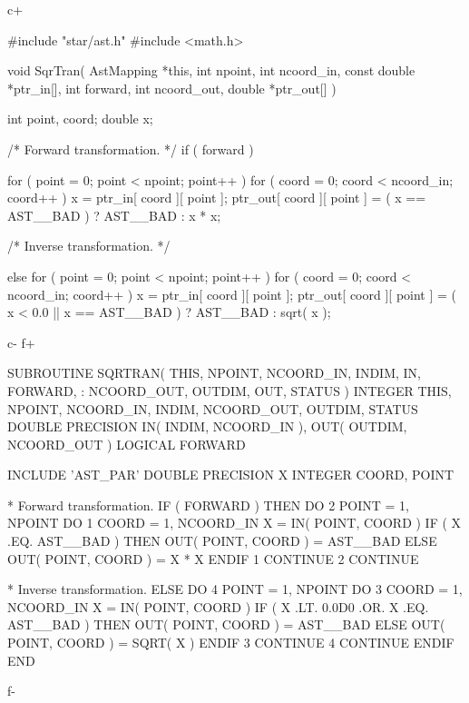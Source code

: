 \documentclass[twoside,11pt]{starlink}
\begin{document}
c+
\small
\begin{terminalv}
#include "star/ast.h"
#include <math.h>

void SqrTran( AstMapping *this, int npoint, int ncoord_in,
              const double *ptr_in[], int forward, int ncoord_out,
              double *ptr_out[] ) {
   int point, coord;
   double x;

/* Forward transformation. */
   if ( forward ) {
      for ( point = 0; point < npoint; point++ ) {
         for ( coord = 0; coord < ncoord_in; coord++ ) {
            x = ptr_in[ coord ][ point ];
            ptr_out[ coord ][ point ] = ( x == AST__BAD ) ? AST__BAD : x * x;
         }
      }

/* Inverse transformation. */
   } else {
      for ( point = 0; point < npoint; point++ ) {
         for ( coord = 0; coord < ncoord_in; coord++ ) {
            x = ptr_in[ coord ][ point ];
            ptr_out[ coord ][ point ] =
               ( x < 0.0 || x == AST__BAD ) ? AST__BAD : sqrt( x );
         }
      }
   }
}
\end{terminalv}
\normalsize
c-
f+
\small
\begin{terminalv}
      SUBROUTINE SQRTRAN( THIS, NPOINT, NCOORD_IN, INDIM, IN, FORWARD,
    :                     NCOORD_OUT, OUTDIM, OUT, STATUS )
      INTEGER THIS, NPOINT, NCOORD_IN, INDIM, NCOORD_OUT, OUTDIM, STATUS
      DOUBLE PRECISION IN( INDIM, NCOORD_IN ), OUT( OUTDIM, NCOORD_OUT )
      LOGICAL FORWARD

      INCLUDE 'AST_PAR'
      DOUBLE PRECISION X
      INTEGER COORD, POINT

*  Forward transformation.
      IF ( FORWARD ) THEN
         DO 2 POINT = 1, NPOINT
            DO 1 COORD = 1, NCOORD_IN
               X = IN( POINT, COORD )
               IF ( X .EQ. AST__BAD ) THEN
                  OUT( POINT, COORD ) = AST__BAD
               ELSE
                  OUT( POINT, COORD ) = X * X
               ENDIF
 1          CONTINUE
 2       CONTINUE

*  Inverse transformation.
      ELSE
         DO 4 POINT = 1, NPOINT
            DO 3 COORD = 1, NCOORD_IN
               X = IN( POINT, COORD )
               IF ( X .LT. 0.0D0 .OR. X .EQ. AST__BAD ) THEN
                  OUT( POINT, COORD ) = AST__BAD
               ELSE
                  OUT( POINT, COORD ) = SQRT( X )
               ENDIF
 3          CONTINUE
 4       CONTINUE
      ENDIF
      END
\end{terminalv}
\normalsize
f-
\end{document}
